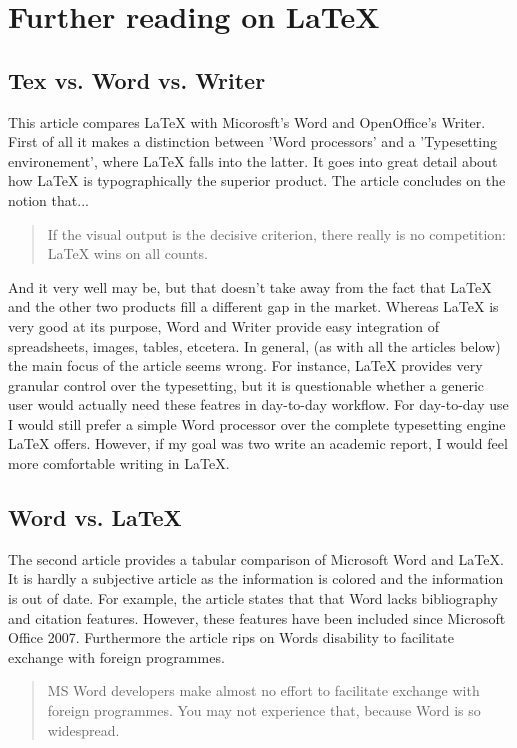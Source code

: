 \section{Further reading on \LaTeX{}}\label{ref:latex}

\subsection{Tex vs. Word vs. Writer}
This article compares LaTeX with Micorosft's Word and OpenOffice's Writer. First of all it makes a distinction between 'Word processors' and a 'Typesetting environement', where LaTeX falls into the latter. It goes into great detail about how LaTeX is typographically the superior product. The article concludes on the notion that...
\begin{quote}
If the visual output is the decisive criterion, there really is no competition: LaTeX wins on all counts.
\end{quote}
And it very well may be, but that doesn't take away from the fact that LaTeX and the other two products fill a different gap in the market. Whereas LaTeX is very good at its purpose, Word and Writer provide easy integration of spreadsheets, images, tables, etcetera. In general, (as with all the articles below) the main focus of the article seems wrong. For instance, LaTeX provides very granular control over the typesetting, but it is questionable whether a generic user would actually need these featres in day-to-day workflow.  For day-to-day use I would still prefer a simple Word processor over the complete typesetting engine LaTeX offers. However, if my goal was two write an academic report, I would feel more comfortable writing in LaTeX.

\subsection{Word vs. LaTeX}
The second article provides a tabular comparison of Microsoft Word and LaTeX. It is hardly a subjective article as the information is colored and the information is out of date. For example, the article states that that Word lacks bibliography and citation features. However, these features have been included since Microsoft Office 2007. Furthermore the article rips on Words disability to facilitate exchange with foreign programmes.

\begin{quote}
MS Word developers make almost no effort to facilitate exchange with foreign programmes. You may not experience that, because Word is so widespread.
\end{quote}

